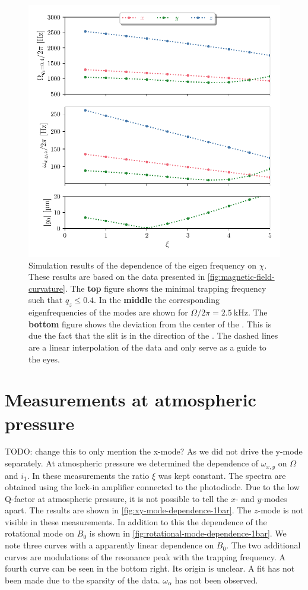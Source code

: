 \begin{figure}
    \centering
    \includegraphics{figures/data/eigen_frequency_xi_dependence.pdf}
    \caption{Simulation results of the dependence of the eigen frequency on $\chi$. These results are based on the data presented in \autoref{fig:magnetic-field-curvature}. The \textbf{top} figure shows the minimal trapping frequency such that $q_z \leq 0.4$. In the \textbf{middle} the corresponding eigenfrequencies of the modes are shown for $\Omega / 2\pi = \qty{2.5}{\kilo\hertz}$. The \textbf{bottom} figure shows the deviation from the center of the \ymode. This is due the fact that the slit is in the direction of the \ymode. The dashed lines are a linear interpolation of the data and only serve as a guide to the eyes.}
\end{figure}

\section{Measurements at atmospheric pressure}
\label{sec:measurements-at-atmospheric-pressure}
TODO: change this to only mention the x-mode? As we did not drive the y-mode separately.
At atmospheric pressure we determined the dependence of $\omega_{x,y}$ on $\Omega$ and $i_1$. In these measurements the ratio $\xi$ was kept constant. The spectra are obtained using the lock-in amplifier connected to the photodiode. Due to the low Q-factor at atmospheric pressure, it is not possible to tell the $x$- and $y$-modes apart. The results are shown in \autoref{fig:xy-mode-dependence-1bar}. The $z$-mode is not visible in these measurements. In addition to this the dependence of the rotational mode on $B_0$ is shown in \autoref{fig:rotational-mode-dependence-1bar}. We note three curves with a apparently linear dependence on $B_0$. The two additional curves are modulations of the resonance peak with the trapping frequency. A fourth curve can be seen in the bottom right. Its origin is unclear. A fit has not been made due to the sparsity of the data. $\omega_\alpha$ has not been observed.

